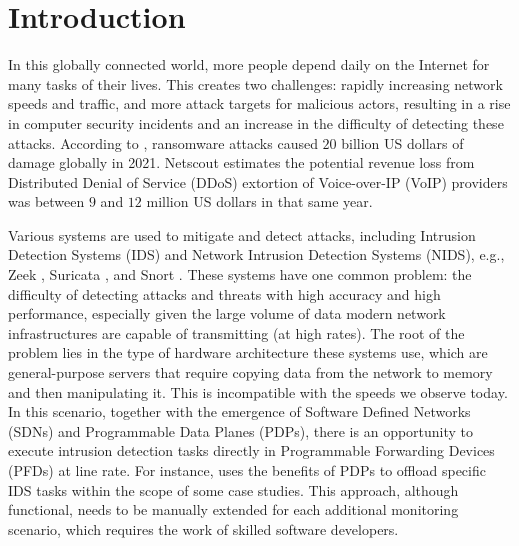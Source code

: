 \chapter{Introduction}
\label{cap:introduction}


In this globally connected world, more people depend daily on the Internet for many tasks of their lives. This creates two challenges: rapidly increasing network speeds and traffic, and more attack targets for malicious actors, resulting in a rise in computer security incidents and an increase in the difficulty of detecting these attacks. According to , ransomware attacks caused $20$ billion US dollars of damage globally in 2021. Netscout \cite{NetscoutTIR2021} estimates the potential revenue loss from Distributed Denial of Service (DDoS) extortion of Voice-over-IP (VoIP) providers was between $9$ and $12$ million US dollars in that same year.


Various systems are used to mitigate and detect attacks, including Intrusion Detection Systems (IDS) and Network Intrusion Detection Systems (NIDS), e.g., Zeek \cite{Paxson1999}, Suricata \cite{SuricataWebsite}, and Snort \cite{SnortWebsite}. These systems have one common problem: the difficulty of detecting attacks and threats with high accuracy and high performance, especially given the large volume of data modern network infrastructures are capable of transmitting (at high rates). The root of the problem lies in the type of hardware architecture these systems use, which are general-purpose servers that require copying data from the network to memory and then manipulating it. This is incompatible with the speeds we observe today. In this scenario, together with the emergence of Software Defined Networks (SDNs) and Programmable Data Planes (PDPs), there is an opportunity to execute intrusion detection tasks directly in Programmable Forwarding Devices (PFDs) at line rate. For instance,  uses the benefits of PDPs to offload specific IDS tasks within the scope of some case studies. This approach, although functional, needs to be manually extended for each additional monitoring scenario, which requires the work of skilled software developers.




